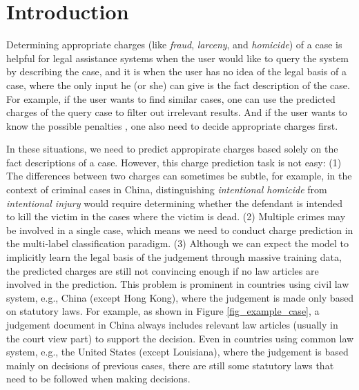 \section{Introduction}
Determining appropriate charges (like \emph{fraud}, \emph{larceny}, and \emph{homicide}) of a case is helpful for legal assistance systems when the user would like to query the system by describing the case, and it is  when the user has no idea of the legal basis of a case, where the only input he (or she) can give is the fact description of the case. 
For example, if the user wants to find similar cases, one can use the predicted charges of the query case to filter out irrelevant results. And if the user wants to know the possible penalties , one also need to decide appropriate charges first.


In these situations, we need to predict appropirate charges based solely on the fact descriptions of a case. 
However, this charge prediction task is not easy:
(1) The differences between two charges can sometimes be subtle, for example, in the context of criminal cases in China, 
distinguishing \emph{intentional homicide} from \emph{intentional injury} would require determining whether the defendant is intended to kill the victim in the cases where the victim is dead.
(2) Multiple crimes may be involved in a single case, which means we need to conduct charge prediction in the multi-label classification paradigm. 
(3) Although we can expect the model to implicitly learn the legal basis of the judgement through massive training data, the predicted charges are still not convincing enough if no law articles are involved in the prediction. This problem is prominent in countries using civil law system, e.g., China (except Hong Kong), where the judgement is made only based on statutory laws. 
For example, as shown in Figure \ref{fig_example_case}, a judgement document in China always includes relevant law articles (usually in the court view part) to support the decision.  
Even in countries using common law system, e.g., the United States (except Louisiana), where the judgement is based mainly on decisions of previous cases, there are still some statutory laws that need to be followed when making decisions. 

